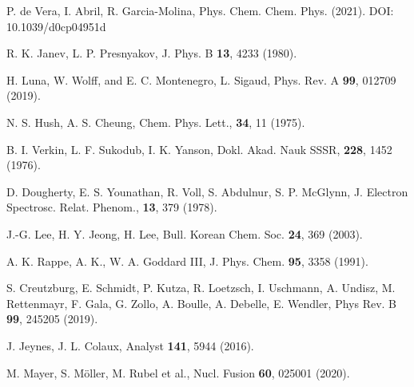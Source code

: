 \begin{thebibliography}{9}

P. de Vera, I. Abril, R. Garcia-Molina,
Phys. Chem. Chem. Phys. (2021). DOI: 10.1039/d0cp04951d

R. K. Janev, L. P. Presnyakov, 
J. Phys. B \textbf{13}, 4233 (1980).

H. Luna, W. Wolff, and E. C. Montenegro, L. Sigaud, 
Phys. Rev. A \textbf{99}, 012709 (2019).

N. S. Hush, A. S. Cheung,  
Chem. Phys. Lett., \textbf{34}, 11 (1975).

B. I. Verkin, L. F. Sukodub, I. K. Yanson, 
Dokl. Akad. Nauk SSSR, \textbf{228}, 1452 (1976).

D. Dougherty, E. S. Younathan, R. Voll, S. Abdulnur, S. P. McGlynn,
J. Electron Spectrosc. Relat. Phenom., \textbf{13}, 379 (1978).

J.-G. Lee, H. Y. Jeong, H. Lee, 
Bull. Korean Chem. Soc. \textbf{24}, 369 (2003).

A. K. Rappe, A. K., W. A. Goddard III,
J. Phys. Chem. \textbf{95}, 3358 (1991).



S. Creutzburg, E. Schmidt, P. Kutza, R. Loetzsch, I. Uschmann,
A. Undisz, M. Rettenmayr, F. Gala, G. Zollo, A. Boulle, A.
Debelle, E. Wendler, 
Phys Rev. B \textbf{99}, 245205 (2019).

J. Jeynes, J. L. Colaux, 
Analyst \textbf{141}, 5944 (2016).

M. Mayer, S. M\"oller, M. Rubel et al., 
Nucl. Fusion \textbf{60}, 025001 (2020).


\end{thebibliography}
